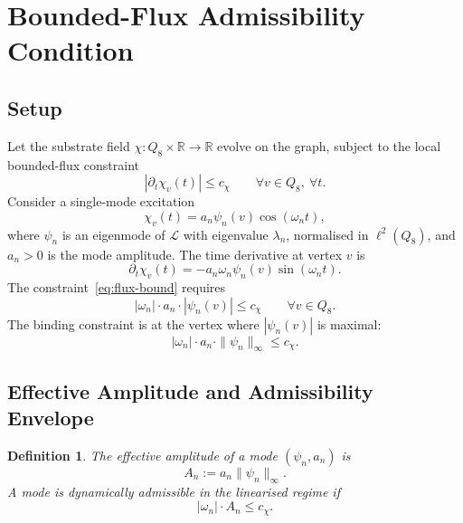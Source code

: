 \documentclass[11pt,a4paper]{article}
\newtheorem{definition}{Definition}
\begin{document}
  \section{Bounded-Flux Admissibility Condition}

  \subsection{Setup}

    Let the substrate field $\chi \colon Q_8 \times \mathbb{R} \to \mathbb{R}$ evolve
    on the graph, subject to the local bounded-flux constraint
    \begin{equation}
      \label{eq:flux-bound}
      |\partial_t \chi_v(t)| \leq c_\chi
      \qquad
      \forall v \in Q_8,
      \ \forall t.
    \end{equation}
    Consider a single-mode excitation
    \begin{equation}
      \chi_v(t) = a_n \psi_n(v) \cos(\omega_n t),
    \end{equation}
    where $\psi_n$ is an eigenmode of $\mathcal{L}$ with eigenvalue $\lambda_n$,
    normalised in $\ell^2(Q_8)$, and $a_n > 0$ is the mode amplitude.
    The time derivative at vertex $v$ is
    \begin{equation}
      \partial_t \chi_v(t) = -a_n \omega_n \psi_n(v) \sin(\omega_n t).
    \end{equation}
    The constraint~\eqref{eq:flux-bound} requires
    \begin{equation}
      |\omega_n| \cdot a_n \cdot |\psi_n(v)| \leq c_\chi
      \qquad
      \forall v \in Q_8.
    \end{equation}
    The binding constraint is at the vertex where $|\psi_n(v)|$ is maximal:
    \begin{equation}
      |\omega_n| \cdot a_n \cdot \|\psi_n\|_\infty \leq c_\chi.
    \end{equation}

  \subsection{Effective Amplitude and Admissibility Envelope}

    \begin{definition}
      The effective amplitude of a mode $(\psi_n, a_n)$ is
      \begin{equation}
        A_n := a_n \|\psi_n\|_\infty.
      \end{equation}
      A mode is dynamically admissible in the linearised regime if
      \begin{equation}
        \label{eq:admissibility}
        |\omega_n| \cdot A_n \leq c_\chi.
      \end{equation}
    \end{definition}
\end{document}
